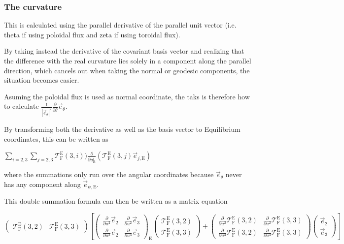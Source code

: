 \subsubsection*{The curvature }

This is calculated using the parallel derivative of the parallel unit vector (i.\+e. theta if using poloidal flux and zeta if using toroidal flux).

By taking instead the derivative of the covariant basis vector and realizing that the difference with the real curvature lies solely in a component along the parallel direction, which cancels out when taking the normal or geodesic components, the situation becomes easier.

Asuming the poloidal flux is used as normal coordinate, the taks is therefore how to calculate $\frac{1}{\left|\vec{e}_\theta\right|^2} \frac{\partial}{\partial \theta} \vec{e}_\theta$.

By transforming both the derivative as well as the basis vector to Equilibrium coordinates, this can be written as

$\sum_{i=2,3} \sum_{j=2,3} \mathcal{T}_\text{F}^\text{E} \left(3,i\right)) \frac{\partial}{\partial u^i_\text{E}} \left( \mathcal{T}_\text{F}^\text{E} \left(3,j\right) \vec{e}_{j,\text{E}}\right)$

where the summations only run over the angular coordinates because $\vec{e}_\theta$ never has any component along $\vec{e}_{\psi,\text{E}}$.

This double summation formula can then be written as a matrix equation

$\begin{pmatrix}\mathcal{T}_\text{F}^\text{E}\left(3,2\right) & \mathcal{T}_\text{F}^\text{E}\left(3,3\right)\end{pmatrix} \left[ \begin{pmatrix} \frac{\partial}{\partial u^2} \vec{e}_{2} & \frac{\partial}{\partial u^2} \vec{e}_{3} \\ \frac{\partial}{\partial u^3} \vec{e}_{2} & \frac{\partial}{\partial u^3} \vec{e}_{3}\end{pmatrix}_\text{E} \begin{pmatrix}\mathcal{T}_\text{F}^\text{E}\left(3,2\right) \\ \mathcal{T}_\text{F}^\text{E}\left(3,3\right)\end{pmatrix} + \begin{pmatrix} \frac{\partial}{\partial u^2} \mathcal{T}_\text{F}^\text{E}\left(3,2\right) & \frac{\partial}{\partial u^2} \mathcal{T}_\text{F}^\text{E}\left(3,3\right) \\ \frac{\partial}{\partial u^3} \mathcal{T}_\text{F}^\text{E}\left(3,2\right) & \frac{\partial}{\partial u^3} \mathcal{T}_\text{F}^\text{E}\left(3,3\right) \end{pmatrix} \begin{pmatrix}\vec{e}_2 \\ \vec{e}_3\end{pmatrix} \right]$

